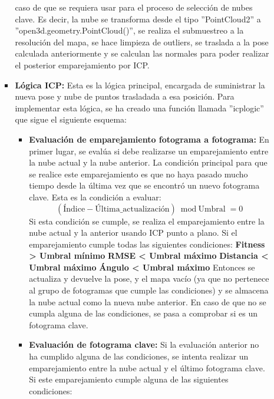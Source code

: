 \documentclass[12pt, a4paper, twoside]{article}
\begin{document}
\begin{itemize}
\begin{itemize}
\begin{itemize}
        caso de que se requiera usar para el proceso de selección de nubes clave. Es decir, la nube se transforma desde el tipo ''PointCloud2'' a 
        ''open3d.geometry.PointCloud()'', se realiza el submuestreo a la resolución del mapa, se hace limpieza de outliers, se traslada a la pose calculada anteriormente y 
        se calculan las normales para poder realizar el posterior emparejamiento por ICP.
        \item \textbf{Lógica ICP:} Esta es la lógica principal, encargada de suministrar la nueva pose y nube de puntos trasladada a esa posición. Para implementar esta 
        lógica, se ha creado una función llamada ''icp\textunderscore logic'' que sigue el siguiente esquema:
        \begin{itemize}
          \item \textbf{Evaluación de emparejamiento fotograma a fotograma:} En primer lugar, se evalúa si debe realizarse un emparejamiento entre la nube actual y la
          nube anterior. La condición principal para que se realice este emparejamiento es que no haya pasado mucho tiempo desde la última vez que se encontró un nuevo fotograma clave.
          Esta es la condición a evaluar:
          \[
          (\text{Índice} - \text{Última\_ actualización}) \bmod \text{Umbral} = 0
          \]
          Si esta condición se cumple, se realiza el emparejamiento entre la nube actual y la anterior usando ICP punto a plano. Si el emparejamiento cumple todas las siguientes condiciones: \newline
          \textbf{Fitness > Umbral mínimo}\newline
          \textbf{RMSE < Umbral máximo}\newline
          \textbf{Distancia < Umbral máximo}\newline
          \textbf{Ángulo < Umbral máximo}\newline
          Entonces se actualiza y devuelve la pose, y el mapa vacío (ya que no pertenece al grupo de fotogramas que cumple las condiciones) y se almacena la nube actual como la nueva nube anterior.
          En caso de que no se cumpla alguna de las condiciones, se pasa a comprobar si es un fotograma clave.
          \item \textbf{Evaluación de fotograma clave:} Si la evaluación anterior no ha cumplido alguna de las condiciones, se intenta realizar un emparejamiento entre la nube actual y 
          el último fotograma clave. Si este emparejamiento cumple alguna de las siguientes condiciones:\newline

\end{itemize}
\end{itemize}
\end{itemize}
\end{itemize}
\end{document}
